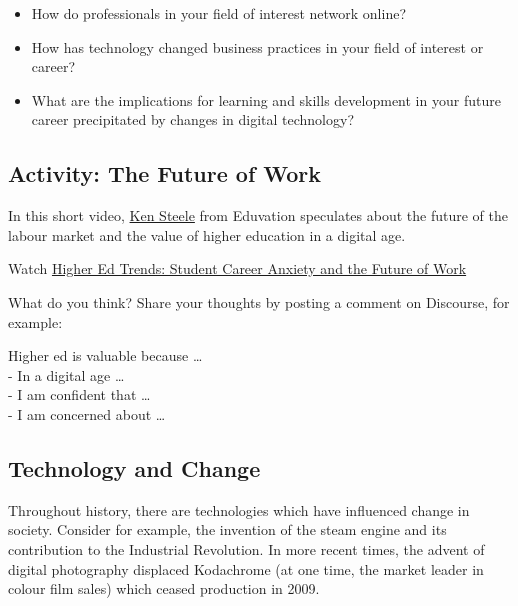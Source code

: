 \documentclass[
]{book}
\providecommand{\tightlist}{%
  \setlength{\itemsep}{0pt}\setlength{\parskip}{0pt}}
\theoremstyle{definition}
\theoremstyle{definition}
\theoremstyle{definition}
\theoremstyle{definition}
\theoremstyle{remark}
\begin{document}
\begin{itemize}
\tightlist
\item
  How do professionals in your field of interest network online?\\
\item
  How has technology changed business practices in your field of interest or career?\\
\item
  What are the implications for learning and skills development in your future career precipitated by changes in digital technology?
\end{itemize}

\hypertarget{activity-the-future-of-work}{%
\subsection*{Activity: The Future of Work}\label{activity-the-future-of-work}}

\begin{reflect}
In this short video, \href{http://eduvation.ca/bio/}{Ken Steele} from Eduvation speculates about the future of the labour market and the value of higher education in a digital age.

Watch \href{https://www.youtube.com/watch?v=iY4UhfQefdU}{Higher Ed Trends: Student Career Anxiety and the Future of Work}

What do you think? Share your thoughts by posting a comment on Discourse, for example:

Higher ed is valuable because \ldots{}\\
- In a digital age \ldots{}\\
- I am confident that \ldots{}\\
- I am concerned about \ldots{}
\end{reflect}

\hypertarget{technology-and-change}{%
\subsection*{Technology and Change}\label{technology-and-change}}

Throughout history, there are technologies which have influenced change in society. Consider for example, the invention of the steam engine and its contribution to the Industrial Revolution. In more recent times, the advent of digital photography displaced Kodachrome (at one time, the market leader in colour film sales) which ceased production in 2009.
\end{document}

